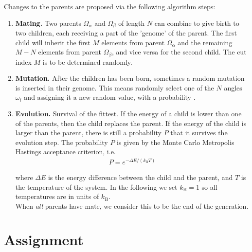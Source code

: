\documentclass{article}
\begin{document}
Changes to the parents are proposed via the following algorithm steps:

\begin{enumerate}

    \item {\bf Mating.}\newline
        Two parents $\Omega_\alpha$ and $\Omega_\beta$ of length $N$ can combine to give birth to two children, each receiving a part of the 'genome' of the parent.
        The first child will inherit the first $M$ elements from parent $\Omega_\alpha$ and the remaining $M-N$ elements from parent $\Omega_\beta$, and vice versa for the second child.
        The cut index $M$ is to be determined randomly.

    \item {\bf Mutation.}\newline
        After the children has been born, sometimes a random mutation is inserted in their genome.
        This means randomly select one of the $N$ angles $\omega_i$ and assigning it a new random value, with a probability .

    \item {\bf Evolution.} \newline
        Survival of the fittest.
        If the energy of a child is lower than one of the parents, then the child replaces the parent.
        If the energy of the child is larger than the parent, there is still a probability $P$ that it survives the evolution step.
        The probability $P$ is given by the Monte Carlo Metropolis Hastings acceptance criterion, i.e.
        \begin{align}
        P = e^{-\Delta E /(k_\mathrm{B}T)}
        \end{align}

        where $\Delta E$ is the energy difference between the child and the parent, and $T$ is the temperature of the system.
        In the following we set $k_\mathrm{B} = 1$ so all temperatures are in units of  $k_\mathrm{B}$.\\
        When {\em all} parents have mate, we consider this to be the end of the generation.

\end{enumerate}


\newpage
\section{Assignment}
\end{document}
